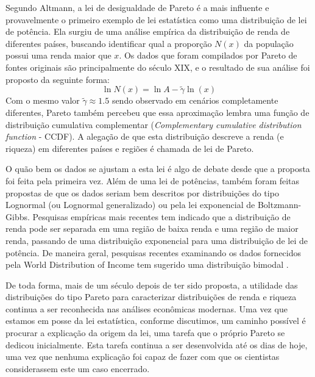 
Segundo Altmann\cite{Altmann_2024}, a lei de desigualdade de Pareto é a mais influente e provavelmente o primeiro exemplo de lei estatística como uma distribuição  de lei de potência.  Ela surgiu de uma análise empírica da distribuição de renda de diferentes países, buscando identificar qual a proporção $N\left(x\right)$ da população possui uma renda maior que $x$. Os dados que foram compilados por Pareto de fontes originais são principalmente do século XIX, e o resultado de sua análise foi proposto da seguinte forma:
$$\ln N\left(x\right)=\ln A-\tilde{\gamma}\ln\left(x\right) \label{pareto}$$
Com o mesmo valor $\tilde{\gamma} \approx 1.5$ sendo observado em cenários completamente diferentes, Pareto também percebeu que essa aproximação lembra uma função de distribuição cumulativa complementar (\textit{Complementary cumulative distribution function} - CCDF). A alegação de que esta distribuição descreve a renda (e riqueza) em diferentes países e regiões é chamada de lei de Pareto.  

O quão bem os dados se ajustam a esta lei é algo de debate desde que a proposta foi feita pela primeira vez.  Além de uma lei de potências, também foram feitas propostas de que os dados seriam bem descritos por distribuições do tipo Lognormal (ou Lognormal generalizado) ou pela lei exponencial de Boltzmann-Gibbs. Pesquisas empíricas mais recentes tem indicado que a distribuição de renda pode ser separada em uma região de baixa renda e uma região de maior renda, passando de uma distribuição exponencial para uma distribuição de lei de potência. De maneira geral, pesquisas recentes examinando os dados fornecidos pela World Distribution of Income tem sugerido uma distribuição bimodal \cite{diss_mods_00007721}.


De toda forma, mais de um século depois de ter sido proposta, a utilidade das distribuições do tipo Pareto para caracterizar distribuições de renda e riqueza continua a ser reconhecida nas análises econômicas modernas. Uma vez que estamos em posse da lei estatística, conforme discutimos, um caminho possível é procurar a explicação da origem da lei, uma tarefa que o próprio Pareto se dedicou inicialmente. Esta tarefa continua a ser desenvolvida até os dias de hoje, uma vez que nenhuma explicação foi capaz de fazer com que os cientistas considerassem este um caso encerrado. 

